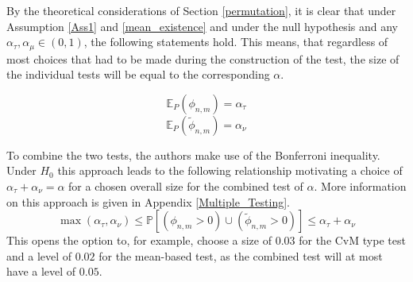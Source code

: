 \documentclass[12pt, a4paper]{article}
\theoremstyle{MAstyle} \newtheorem{assumption}{Assumption}[section]
\theoremstyle{MAstyle} \newtheorem{definition}{Definition}[section]
\theoremstyle{MAstyle} \newtheorem{theorem}{Theorem}[section]
\begin{document}
			By the theoretical considerations of Section \ref{permutation}, it is clear that under Assumption \ref{Ass1} and \ref{mean_existence} and under the null hypothesis and any $\alpha_{\tau}, \alpha_{\mu} \in (0,1)$, the following statements hold. This means, that regardless of most choices that had to be made during the construction of the test, the size of the individual tests will be equal to the corresponding $\alpha$.
			\begin{multicols}{2}
				\noindent
				\begin{equation*}
					\mathbb{E}_P\left(\phi_{n,m}\right) = \alpha_{\tau}
				\end{equation*}			
				\begin{equation}
					\mathbb{E}_P\left(\tilde{\phi}_{n,m}\right) = \alpha_{\nu}
				\end{equation}
			\end{multicols}
			
			To combine the two tests, the authors make use of the Bonferroni inequality. Under $H_0$ this approach leads to the following relationship motivating a choice of $\alpha_{\tau} + \alpha_{\nu} = \alpha$ for a chosen overall size for the combined test of $\alpha$. More information on this approach is given in Appendix \ref{Multiple_Testing}.
			\begin{equation}
				\max(\alpha_{\tau}, \alpha_{\nu}) \leq \mathbb{P}\left[(\phi_{n,m} > 0) \cup (\tilde{\phi}_{n,m} > 0)\right] \leq \alpha_{\tau} + \alpha_{\nu}
			\end{equation}
			This opens the option to, for example, choose a size of $0.03$ for the CvM type test and a level of $0.02$ for the mean-based test, as the combined test will at most have a level of $0.05$.
			
\end{document}
